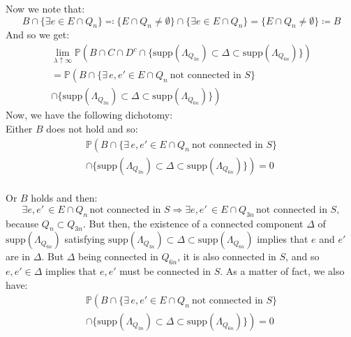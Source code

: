 \documentclass[10pt,a4paper]{amsart}
\theoremstyle{exampstyle}
\theoremstyle{exampnotations}
\begin{document}
Now we note that:
\begin{equation*}
    B \cap \lbrace \exists e \in E \cap Q_n \rbrace \eqqcolon \lbrace E \cap Q_n \neq \emptyset \rbrace \cap \lbrace \exists e \in E \cap Q_n \rbrace = \lbrace E \cap Q_n \neq \emptyset \rbrace \coloneqq B
\end{equation*}
And so we get:
\begin{gather*}
    \lim_{\lambda \uparrow \infty} \mathbb{P}\left(B \cap C \cap D^c  \cap \Big\lbrace \text{supp}(\Lambda_{Q_{3n}}) \subset \Delta \subset \text{supp}(\Lambda_{Q_{6n}}) \Big\rbrace \right) 
    \\ = \mathbb{P}\left(B  \cap \Big\lbrace \exists \, e,e' \in E\cap Q_n \: \text{not connected in } S  \Big\rbrace \right. \\ \left. \cap \Big\lbrace \text{supp}(\Lambda_{Q_{3n}}) \subset \Delta \subset \text{supp}(\Lambda_{Q_{6n}}) \Big\rbrace  \right)
\end{gather*}
Now, we have the following dichotomy: \\
Either $B$ does not hold and so:
\begin{gather*}
    \mathbb{P}\left(B  \cap \Big\lbrace \exists \, e,e' \in E\cap Q_n \: \text{not connected in } S  \Big\rbrace \right. \\ \left. \cap \Big\lbrace \text{supp}(\Lambda_{Q_{3n}}) \subset \Delta \subset \text{supp}(\Lambda_{Q_{6n}}) \Big\rbrace  \right) = 0
\end{gather*} \\
Or $B$ holds and then: 
\begin{equation*}
    \exists e,e' \, \in E \cap Q_n \, \text{not connected in } S \Rightarrow \exists e,e' \, \in E \cap Q_{3n} \, \text{not connected in } S,
\end{equation*}
because $Q_n \subset Q_{3n}$. But then, the existence of a connected component $\Delta$ of $\text{supp}(\Lambda_{Q_{6n}})$ satisfying $\text{supp}(\Lambda_{Q_{3n}}) \subset \Delta \subset \text{supp}(\Lambda_{Q_{6n}})$ implies that $e$ and $e'$ are in $\Delta$. But $\Delta$ being connected in $Q_{6n}$, it is also connected in $S$, and so $e,e' \in \Delta$ implies that $e,e'$ must be connected in $S$. As a matter of fact, we also have:
\begin{gather*}
    \mathbb{P}\left(B  \cap \Big\lbrace \exists \, e,e' \in E\cap Q_n \: \text{not connected in } S  \Big\rbrace \right. \\ \left. \cap \Big\lbrace \text{supp}(\Lambda_{Q_{3n}}) \subset \Delta \subset \text{supp}(\Lambda_{Q_{6n}}) \Big\rbrace  \right) = 0
\end{gather*}
\end{document}

